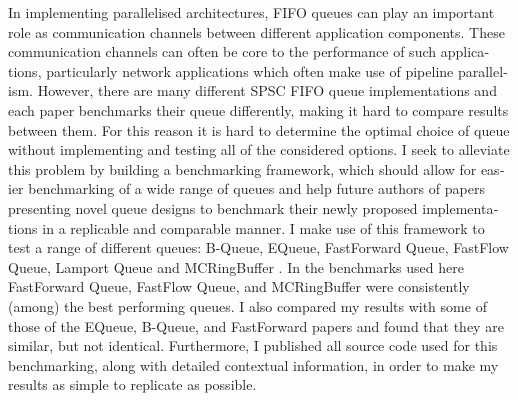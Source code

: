 \null\vfil
\begin{otherlanguage}{english}
\begin{center}\textsf{\textbf{\abstractname}}\end{center}

\noindent In implementing parallelised architectures, FIFO queues can play an important role as communication channels
between different application components\cite{WangCheng2009}.
These communication channels can often be core to the performance of such applications, particularly network
applications which often make use of pipeline parallelism\cite{Upadhyaya2007,WangCheng2009}.
However, there are many different SPSC FIFO queue implementations and each paper benchmarks their queue
differently, making it hard to compare results between them.
For this reason it is hard to determine the optimal choice of queue without implementing and testing all of the
considered options.
I seek to alleviate this problem by building a benchmarking framework, which should allow for easier
benchmarking of a wide range of queues and help future authors of papers presenting novel queue designs to
benchmark their newly proposed implementations in a replicable and comparable manner.
I make use of this framework to test a range of different queues: B-Queue, EQueue, FastForward Queue,
FastFlow Queue, Lamport Queue and MCRingBuffer \cite{B-Queue,EQueue,FastForward,FastFlowGithub,Lamport,MCRingBuffer}.
In the benchmarks used here FastForward Queue, FastFlow Queue, and MCRingBuffer were consistently (among) the
best performing queues.
I also compared my results with some of those of the EQueue, B-Queue, and FastForward papers and found that
they are similar, but not identical.
Furthermore, I published all source code used for this benchmarking, along with detailed contextual information,
in order to make my results as simple to replicate as possible.

\end{otherlanguage}
\vfil\null
